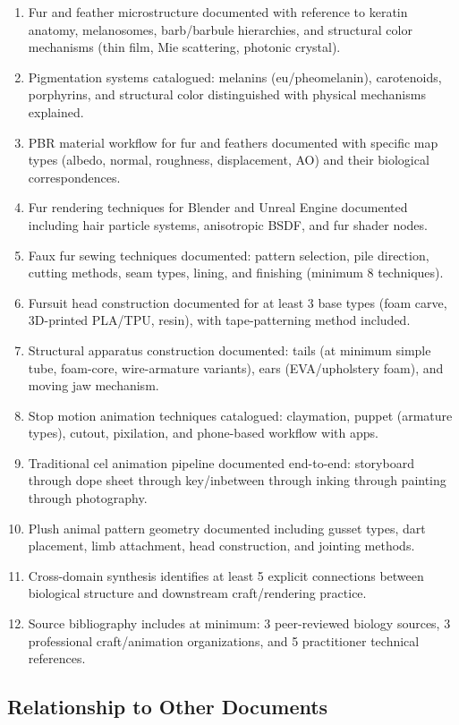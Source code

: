 \documentclass[11pt,letterpaper]{article}
\begin{document}
\begin{enumerate}
  \item Fur and feather microstructure documented with reference to keratin anatomy, melanosomes, barb/barbule hierarchies, and structural color mechanisms (thin film, Mie scattering, photonic crystal).
  \item Pigmentation systems catalogued: melanins (eu/pheomelanin), carotenoids, porphyrins, and structural color distinguished with physical mechanisms explained.
  \item PBR material workflow for fur and feathers documented with specific map types (albedo, normal, roughness, displacement, AO) and their biological correspondences.
  \item Fur rendering techniques for Blender and Unreal Engine documented including hair particle systems, anisotropic BSDF, and fur shader nodes.
  \item Faux fur sewing techniques documented: pattern selection, pile direction, cutting methods, seam types, lining, and finishing (minimum 8 techniques).
  \item Fursuit head construction documented for at least 3 base types (foam carve, 3D-printed PLA/TPU, resin), with tape-patterning method included.
  \item Structural apparatus construction documented: tails (at minimum simple tube, foam-core, wire-armature variants), ears (EVA/upholstery foam), and moving jaw mechanism.
  \item Stop motion animation techniques catalogued: claymation, puppet (armature types), cutout, pixilation, and phone-based workflow with apps.
  \item Traditional cel animation pipeline documented end-to-end: storyboard through dope sheet through key/inbetween through inking through painting through photography.
  \item Plush animal pattern geometry documented including gusset types, dart placement, limb attachment, head construction, and jointing methods.
  \item Cross-domain synthesis identifies at least 5 explicit connections between biological structure and downstream craft/rendering practice.
  \item Source bibliography includes at minimum: 3 peer-reviewed biology sources, 3 professional craft/animation organizations, and 5 practitioner technical references.
\end{enumerate}

\subsection{Relationship to Other Documents}
\end{document}
